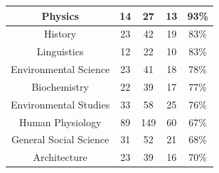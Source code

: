 \documentclass[10]{article}
\begin{document}
\begin{longtable}[c]{|ccccc|}
	\multicolumn{1}{|c|}{Physics}                                    & \multicolumn{1}{c|}{14}                              & \multicolumn{1}{c|}{27}                                  & \multicolumn{1}{c|}{13}                 & 93\%                  \\ \hline
	\multicolumn{1}{|c|}{History}                                    & \multicolumn{1}{c|}{23}                              & \multicolumn{1}{c|}{42}                                  & \multicolumn{1}{c|}{19}                 & 83\%                  \\ \hline
	\multicolumn{1}{|c|}{Linguistics}                                & \multicolumn{1}{c|}{12}                              & \multicolumn{1}{c|}{22}                                  & \multicolumn{1}{c|}{10}                 & 83\%                  \\ \hline
	\multicolumn{1}{|c|}{Environmental Science}                      & \multicolumn{1}{c|}{23}                              & \multicolumn{1}{c|}{41}                                  & \multicolumn{1}{c|}{18}                 & 78\%                  \\ \hline
	\multicolumn{1}{|c|}{Biochemistry}                               & \multicolumn{1}{c|}{22}                              & \multicolumn{1}{c|}{39}                                  & \multicolumn{1}{c|}{17}                 & 77\%                  \\ \hline
	\multicolumn{1}{|c|}{Environmental Studies}                      & \multicolumn{1}{c|}{33}                              & \multicolumn{1}{c|}{58}                                  & \multicolumn{1}{c|}{25}                 & 76\%                  \\ \hline
	\multicolumn{1}{|c|}{Human Physiology}                           & \multicolumn{1}{c|}{89}                              & \multicolumn{1}{c|}{149}                                 & \multicolumn{1}{c|}{60}                 & 67\%                  \\ \hline
	\multicolumn{1}{|c|}{General Social Science}                     & \multicolumn{1}{c|}{31}                              & \multicolumn{1}{c|}{52}                                  & \multicolumn{1}{c|}{21}                 & 68\%                  \\ \hline
	\multicolumn{1}{|c|}{Architecture}                               & \multicolumn{1}{c|}{23}                              & \multicolumn{1}{c|}{39}                                  & \multicolumn{1}{c|}{16}                 & 70\%                  \\ \hline

\end{longtable}
\end{document}
